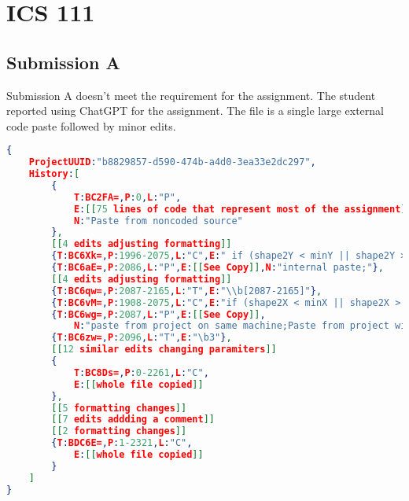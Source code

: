 \documentclass[12pt,final,thesis,actual]{uhthesis}
\newcommand{\n}{\hfill\break}
\begin{document}
\section{\textbf{ICS 111}}

\subsection{Submission A}
Submission A doesn't meet the requirement for the assignment.  The student reported using ChatGPT for the assignment.  The file is a single large external code paste followed by minor edits.
\begin{lstlisting}[language=json]
{
	ProjectUUID:"b8829857-d590-474b-a4d0-3ea33e2dc297",
	History:[
		{
			T:BC2FA=,P:0,L:"P",
			E:[[75 lines of code that represent most of the assignment]],
			N:"Paste from noncoded source"
		},
		[[4 edits adjusting formatting]]
		{T:BC6Xk=,P:1996-2075,L:"C",E:" if (shape2Y < minY || shape2Y > maxY - shape2Size) {\n      shape2SpeedY *= -1;"},
		{T:BC6aE=,P:2086,L:"P",E:[[See Copy]],N:"internal paste;"},
		[[4 edits adjusting formatting]]
		{T:BC6qw=,P:2087-2165,L:"T",E:"\\b[2087-2165]"},
		{T:BC6vM=,P:1908-2075,L:"C",E:"if (shape2X < minX || shape2X > maxX - shape2Size) {\n      shape2SpeedX *= -1;\n    }\n    if (shape2Y < minY || shape2Y > maxY - shape2Size) {\n      shape2SpeedY *= -1;"},
		{T:BC6wg=,P:2087,L:"P",E:[[See Copy]],
			N:"paste from project on same machine;Paste from project with UUID fragment b8829857-d590-474b-a4d0-3ea33e2dc297 10 bytes long;"},[[IDE bug, this is internal]]
		{T:BC6zw=,P:2096,L:"T",E:"\b3"},
		[[12 similar edits changing paramiters]]
		{
			T:BC8Ds=,P:0-2261,L:"C",
			E:[[whole file copied]]
		},
		[[5 formatting changes]]
		[[7 edits addding a comment]]
		[[2 formatting changes]]
		{T:BDC6E=,P:1-2321,L:"C",
			E:[[whole file copied]]
		}
	]
}

\end{lstlisting}
\end{document}
